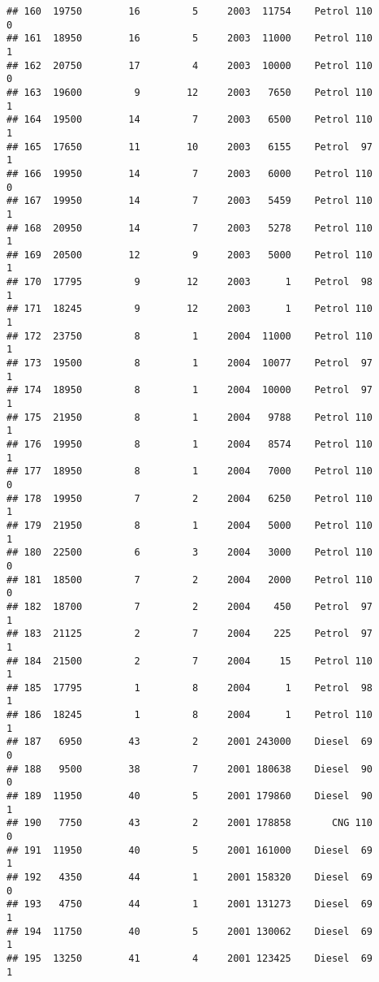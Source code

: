 \documentclass[]{article}
\begin{document}
\begin{verbatim}
## 160  19750        16         5     2003  11754    Petrol 110         0
## 161  18950        16         5     2003  11000    Petrol 110         1
## 162  20750        17         4     2003  10000    Petrol 110         0
## 163  19600         9        12     2003   7650    Petrol 110         1
## 164  19500        14         7     2003   6500    Petrol 110         1
## 165  17650        11        10     2003   6155    Petrol  97         1
## 166  19950        14         7     2003   6000    Petrol 110         0
## 167  19950        14         7     2003   5459    Petrol 110         1
## 168  20950        14         7     2003   5278    Petrol 110         1
## 169  20500        12         9     2003   5000    Petrol 110         1
## 170  17795         9        12     2003      1    Petrol  98         1
## 171  18245         9        12     2003      1    Petrol 110         1
## 172  23750         8         1     2004  11000    Petrol 110         1
## 173  19500         8         1     2004  10077    Petrol  97         1
## 174  18950         8         1     2004  10000    Petrol  97         1
## 175  21950         8         1     2004   9788    Petrol 110         1
## 176  19950         8         1     2004   8574    Petrol 110         1
## 177  18950         8         1     2004   7000    Petrol 110         0
## 178  19950         7         2     2004   6250    Petrol 110         1
## 179  21950         8         1     2004   5000    Petrol 110         1
## 180  22500         6         3     2004   3000    Petrol 110         0
## 181  18500         7         2     2004   2000    Petrol 110         0
## 182  18700         7         2     2004    450    Petrol  97         1
## 183  21125         2         7     2004    225    Petrol  97         1
## 184  21500         2         7     2004     15    Petrol 110         1
## 185  17795         1         8     2004      1    Petrol  98         1
## 186  18245         1         8     2004      1    Petrol 110         1
## 187   6950        43         2     2001 243000    Diesel  69         0
## 188   9500        38         7     2001 180638    Diesel  90         0
## 189  11950        40         5     2001 179860    Diesel  90         1
## 190   7750        43         2     2001 178858       CNG 110         0
## 191  11950        40         5     2001 161000    Diesel  69         1
## 192   4350        44         1     2001 158320    Diesel  69         0
## 193   4750        44         1     2001 131273    Diesel  69         1
## 194  11750        40         5     2001 130062    Diesel  69         1
## 195  13250        41         4     2001 123425    Diesel  69         1

\end{verbatim}
\end{document}

